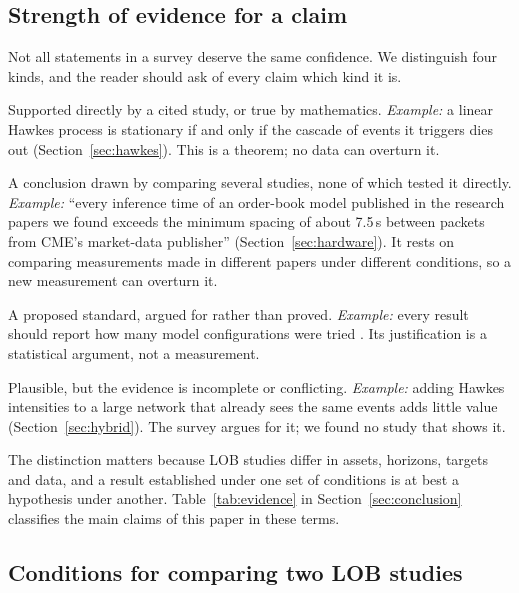 \subsection{Strength of evidence for a claim}

Not all statements in a survey deserve the same confidence. We distinguish four kinds, and the
reader should ask of every claim which kind it is.

\begin{description}[leftmargin=1.5em,style=nextline,itemsep=3pt]
\item[Established result] Supported directly by a cited study, or true by mathematics.
  \emph{Example:} a linear Hawkes process is stationary if and only if the cascade of events it
  triggers dies out (Section~\ref{sec:hawkes}). This is a theorem; no data can overturn it.
\item[Empirical synthesis] A conclusion drawn by comparing several studies, none of which tested it
  directly. \emph{Example:} ``every inference time of an order-book model published in the research papers we found exceeds the minimum spacing
  of about 7.5\,\textmu s between packets from CME's market-data publisher'' (Section~\ref{sec:hardware}). It rests on comparing measurements made in different papers under different
  conditions, so a new measurement can overturn it.
\item[Methodological recommendation] A proposed standard, argued for rather than proved.
  \emph{Example:} every result should report how many model configurations were tried
  \citep{white2000,harvey2016}. Its justification is a statistical argument, not a measurement.
\item[Open hypothesis] Plausible, but the evidence is incomplete or conflicting. \emph{Example:}
  adding Hawkes intensities to a large network that already sees the same events adds little value
  (Section~\ref{sec:hybrid}). The survey argues for it; we found no study that shows it.
\end{description}

\noindent The distinction matters because LOB studies differ in assets, horizons, targets and data,
and a result established under one set of conditions is at best a hypothesis under another.
Table~\ref{tab:evidence} in Section~\ref{sec:conclusion} classifies the main claims of this paper
in these terms.

\subsection{Conditions for comparing two LOB studies}
\label{sec:comparable}

